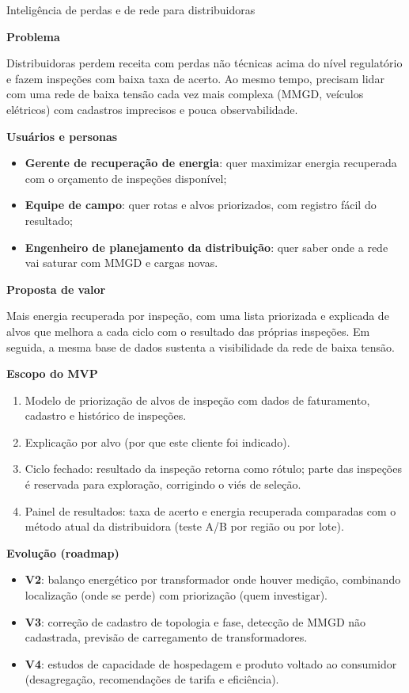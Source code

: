 \documentclass[11pt,a4paper]{article}
\newcommand{\prodsec}[1]{\par\medskip\noindent\textbf{\color{prodcolor}#1}\par\smallskip}
\begin{document}
\begin{produto}{Inteligência de perdas e de rede para distribuidoras}

\prodsec{Problema}
Distribuidoras perdem receita com perdas não técnicas acima do nível
regulatório e fazem inspeções com baixa taxa de acerto. Ao mesmo tempo,
precisam lidar com uma rede de baixa tensão cada vez mais complexa (MMGD,
veículos elétricos) com cadastros imprecisos e pouca observabilidade.

\prodsec{Usuários e personas}
\begin{itemize}
  \item \textbf{Gerente de recuperação de energia}: quer maximizar energia
    recuperada com o orçamento de inspeções disponível;
  \item \textbf{Equipe de campo}: quer rotas e alvos priorizados, com
    registro fácil do resultado;
  \item \textbf{Engenheiro de planejamento da distribuição}: quer saber onde a
    rede vai saturar com MMGD e cargas novas.
\end{itemize}

\prodsec{Proposta de valor}
Mais energia recuperada por inspeção, com uma lista priorizada e explicada de
alvos que melhora a cada ciclo com o resultado das próprias inspeções. Em
seguida, a mesma base de dados sustenta a visibilidade da rede de baixa
tensão.

\prodsec{Escopo do MVP}
\begin{enumerate}
  \item Modelo de priorização de alvos de inspeção com dados de faturamento,
    cadastro e histórico de inspeções.
  \item Explicação por alvo (por que este cliente foi indicado).
  \item Ciclo fechado: resultado da inspeção retorna como rótulo; parte das
    inspeções é reservada para exploração, corrigindo o viés de seleção.
  \item Painel de resultados: taxa de acerto e energia recuperada comparadas
    com o método atual da distribuidora (teste A/B por região ou por lote).
\end{enumerate}

\prodsec{Evolução (roadmap)}
\begin{itemize}
  \item \textbf{V2}: balanço energético por transformador onde houver
    medição, combinando localização (onde se perde) com priorização (quem
    investigar).
  \item \textbf{V3}: correção de cadastro de topologia e fase, detecção de
    MMGD não cadastrada, previsão de carregamento de transformadores.
  \item \textbf{V4}: estudos de capacidade de hospedagem e produto voltado ao
    consumidor (desagregação, recomendações de tarifa e eficiência).
\end{itemize}


\end{produto}
\end{document}
